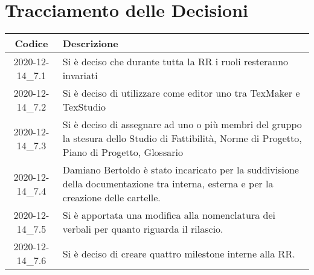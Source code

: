 \section*{Tracciamento delle Decisioni}

\begin{center}
	\begin{longtable}{|c|p{14.5cm}|}
	\hline
	\rowcolor{lighter-grayer}
	\textbf{Codice} & \textbf{Descrizione} \\
	\hline
	\endfirsthead

	
	2020-12-14\_7.1 & Si è deciso che durante tutta la RR i ruoli resteranno invariati \\
	\hline
	2020-12-14\_7.2 & Si è deciso di utilizzare come editor \glock{\LaTeX} uno tra TexMaker e TexStudio \\
	\hline
	2020-12-14\_7.3 & Si è deciso di assegnare ad uno o più membri del gruppo la stesura dello Studio di Fattibilità, Norme di Progetto, Piano di Progetto, Glossario  \\
	\hline
	2020-12-14\_7.4 & Damiano Bertoldo è stato incaricato per la suddivisione della documentazione tra interna, esterna e per la creazione delle cartelle.  \\
	\hline
	2020-12-14\_7.5 & Si è apportata una modifica alla nomenclatura dei verbali per quanto riguarda il rilascio. \\
	\hline
	2020-12-14\_7.6 & Si è deciso di creare quattro milestone interne alla RR.  \\
	\hline

	\end{longtable}
\end{center}